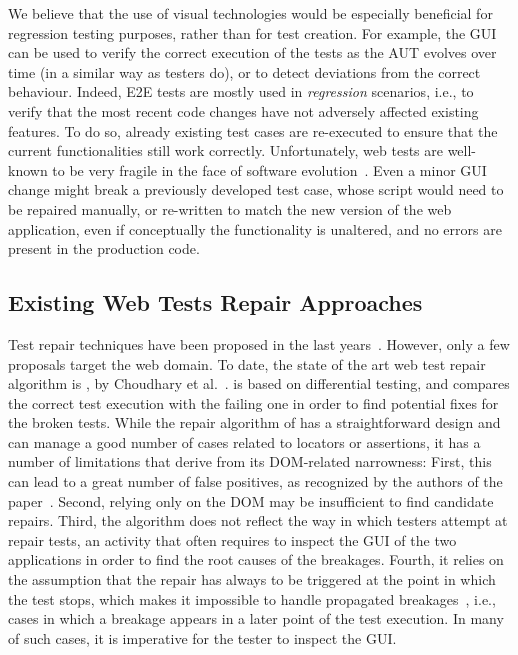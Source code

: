 We believe that the use of visual technologies would be especially beneficial for regression testing purposes, rather than for test creation. For example, the GUI can be used to verify the correct execution of the tests as the AUT evolves over time (in a similar way as testers do), or to detect deviations from the correct behaviour.
Indeed, E2E tests are mostly used in \textit{regression} scenarios, i.e., to verify that the most recent code changes have not adversely affected existing features. To do so, already existing test cases are re-executed to ensure that the current functionalities still work correctly. 
%
Unfortunately, web tests are well-known to be very fragile in the face of software evolution~\cite{2016-leotta-Advances,2016-Leotta-JSEP,Hammoudi-2016-ICST}. %
Even a minor GUI change might break a previously developed test case, whose script would need to be repaired manually, or re-written to match the new version of the web application, even if conceptually the functionality is unaltered, and no errors are present in the production code.

\subsection{Existing Web Tests Repair Approaches}

Test repair techniques have been proposed in the last years~\cite{Gao:2016:SGT:3046547.3046580,Daniel:2011:AGR:2002931.2002937,Daniel:2009:RSR:1747491.1747538,Daniel:2010:TRU:1831708.1831734,Choudhary:2011:WWA:2002931.2002935,Hammoudi-2016-FSE}. However, only a few proposals target the web domain. To date, the state of the art web test repair algorithm is \water, by Choudhary et al.~\cite{Choudhary:2011:WWA:2002931.2002935}. \water is based on differential testing, and compares the correct test execution with the failing one in order to find potential fixes for the broken tests. While the repair algorithm of \water has a straightforward design and can manage a good number of cases related to locators or assertions, it has a number of limitations that derive from its  DOM-related narrowness: First, this can lead to a great number of false positives, as recognized by the authors of the paper~\cite{Choudhary:2011:WWA:2002931.2002935}. Second, 
 relying only on the DOM may be insufficient to find candidate repairs. Third, the algorithm does not reflect the way in which testers attempt at repair tests, an activity that often requires to inspect the GUI of the two applications in order to find the root causes of the breakages. Fourth, it relies on the assumption that the repair has always to be triggered at the point in which the test stops, which makes it impossible to handle propagated breakages~\cite{Hammoudi-2016-ICST}, i.e., cases in which a breakage appears in a later point of the test execution. In many of such cases, it is imperative for the tester to inspect the GUI.


